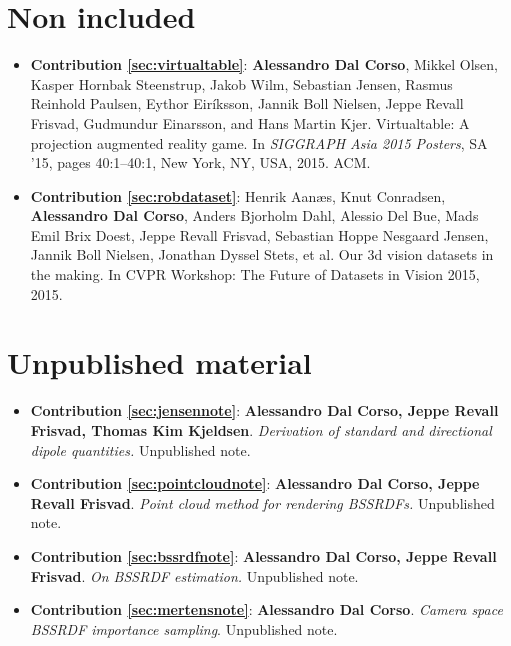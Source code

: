 \section*{Non included}
\begin{itemize}
\item  \textbf{Contribution \ref{sec:virtualtable}}: \textbf{Alessandro Dal Corso}, Mikkel Olsen, Kasper Hornbak Steenstrup, Jakob Wilm, Sebastian Jensen, Rasmus Reinhold Paulsen, Eythor Eiríksson, Jannik Boll Nielsen, Jeppe Revall Frisvad, Gudmundur Einarsson, and Hans Martin Kjer. Virtualtable: A projection augmented reality game. In \textit{SIGGRAPH Asia 2015 Posters}, SA ’15, pages 40:1–40:1, New York, NY, USA, 2015. ACM.~\cite{dalcorsosig15}
\item  \textbf{Contribution \ref{sec:robdataset}}: Henrik Aanæs, Knut Conradsen, \textbf{Alessandro Dal Corso}, Anders Bjorholm Dahl, Alessio Del Bue, Mads Emil Brix Doest, Jeppe Revall Frisvad, Sebastian Hoppe Nesgaard Jensen, Jannik Boll Nielsen, Jonathan Dyssel Stets, et al. Our 3d vision datasets in the making. In CVPR Workshop: The Future of Datasets in Vision 2015, 2015.~\cite{aanaes2015our}
\end{itemize}

\section*{Unpublished material}
\begin{itemize}
\item  \textbf{Contribution \ref{sec:jensennote}}: \textbf{Alessandro Dal Corso, Jeppe Revall Frisvad, Thomas Kim Kjeldsen}. \textit{Derivation of standard and directional dipole quantities.} Unpublished note. %
\item  \textbf{Contribution \ref{sec:pointcloudnote}}: \textbf{Alessandro Dal Corso, Jeppe Revall Frisvad}. \textit{Point cloud method for rendering BSSRDFs.} Unpublished note. %
\item  \textbf{Contribution \ref{sec:bssrdfnote}}: \textbf{Alessandro Dal Corso, Jeppe Revall Frisvad}. \textit{On BSSRDF estimation.} Unpublished note. %
\item  \textbf{Contribution \ref{sec:mertensnote}}:  \textbf{Alessandro Dal Corso}. \textit{Camera space BSSRDF importance sampling}. Unpublished note. %
\end{itemize}





